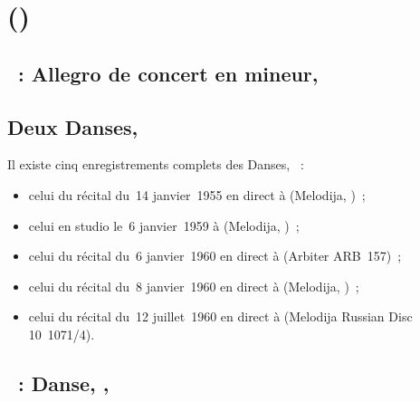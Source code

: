 \chapter[%
Aleksandr Skrjabin (\Dates{1872-01-06}{1915-04-27})][%
Aleksandr Skrjabin]{%
\AScriabine{} ()}
\label{chap:Scriabine}

\section{\ifChrono \Scriabine{}~: \fi
Allegro de concert en \kB \Flat mineur, }
\label{\thesection}

\begin{workitemize}
 \item{}
 \begin{perfitemize}
  \item\NoEdition{}
 \end{perfitemize}
\end{workitemize}

\section*{%
Deux Danses, }

Il existe cinq enregistrements complets des Danses, ~:
\begin{itemize}
 \item
 celui du récital du~14 janvier~1955 en direct à \MCGH (Melodija, )~;
 \item
 celui en studio le~6 janvier~1959 à \Moscow (Melodija, )~;
 \item
 celui du récital du~6 janvier~1960 en direct à \MSHM (Arbiter ARB~157)~;
 \item
 celui du récital du~8 janvier~1960 en direct à \MCSH (Melodija, )~;
 \item
 celui du récital du~12 juillet~1960 en direct à \MSHM (Melodija Russian
 Disc 10~1071/4).
\end{itemize}

\section{\ifChrono \Scriabine{}~: \fi
Danse,  , }
\label{\thesection}

